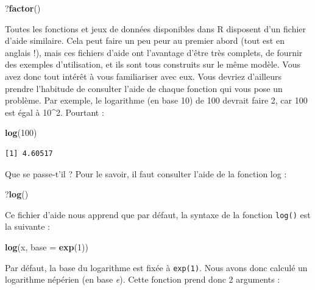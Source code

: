 \documentclass[a4paperpaper,]{article}
\newenvironment{Shaded}{\begin{snugshade}}{\end{snugshade}}
\newcommand{\DataTypeTok}[1]{\textcolor[rgb]{0.00,0.34,0.68}{#1}}
\newcommand{\DecValTok}[1]{\textcolor[rgb]{0.69,0.50,0.00}{#1}}
\newcommand{\KeywordTok}[1]{\textcolor[rgb]{0.12,0.11,0.11}{\textbf{#1}}}
\newcommand{\NormalTok}[1]{\textcolor[rgb]{0.12,0.11,0.11}{#1}}
\begin{document}
\begin{Shaded}
\begin{Highlighting}[]
\NormalTok{?}\KeywordTok{factor}\NormalTok{()}
\end{Highlighting}
\end{Shaded}

Toutes les fonctions et jeux de données disponibles dans R disposent d'un fichier d'aide similaire. Cela peut faire un peu peur au premier abord (tout est en anglais !), mais ces fichiers d'aide ont l'avantage d'être très complets, de fournir des exemples d'utilisation, et ils sont tous construits sur le même modèle. Vous avez donc tout intérêt à vous familiariser avec eux. Vous devriez d'ailleurs prendre l'habitude de consulter l'aide de chaque fonction qui vous pose un problème. Par exemple, le logarithme (en base 10) de 100 devrait faire 2, car 100 est égal à 10\^{}2. Pourtant :

\begin{Shaded}
\begin{Highlighting}[]
\KeywordTok{log}\NormalTok{(}\DecValTok{100}\NormalTok{)}
\end{Highlighting}
\end{Shaded}

\begin{verbatim}
[1] 4.60517
\end{verbatim}

Que se passe-t'il ? Pour le savoir, il faut consulter l'aide de la fonction log :

\begin{Shaded}
\begin{Highlighting}[]
\NormalTok{?}\KeywordTok{log}\NormalTok{()}
\end{Highlighting}
\end{Shaded}

Ce fichier d'aide nous apprend que par défaut, la syntaxe de la fonction \texttt{log()} est la suivante :

\begin{Shaded}
\begin{Highlighting}[]
\KeywordTok{log}\NormalTok{(x, }\DataTypeTok{base =} \KeywordTok{exp}\NormalTok{(}\DecValTok{1}\NormalTok{))}
\end{Highlighting}
\end{Shaded}

Par défaut, la base du logarithme est fixée à \texttt{exp(1)}. Nous avons donc calculé un logarithme népérien (en base \emph{e}). Cette fonction prend donc 2 arguments :
\end{document}
